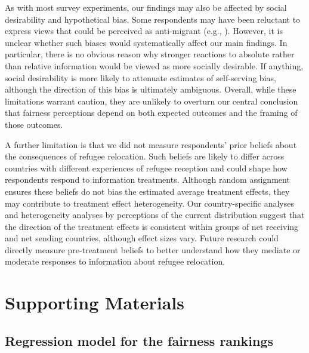 \documentclass[
  12pt,
  a4paper,
]{article}
\begin{document}
As with most survey experiments, our findings may also be affected by social desirability and hypothetical bias. Some respondents may have been reluctant to express views that could be perceived as anti-migrant (e.g., ). However, it is unclear whether such biases would systematically affect our main findings. In particular, there is no obvious reason why stronger reactions to absolute rather than relative information would be viewed as more socially desirable. If anything, social desirability is more likely to attenuate estimates of self-serving bias, although the direction of this bias is ultimately ambiguous. Overall, while these limitations warrant caution, they are unlikely to overturn our central conclusion that fairness perceptions depend on both expected outcomes and the framing of those outcomes.

A further limitation is that we did not measure respondents' prior beliefs about the consequences of refugee relocation. Such beliefs are likely to differ across countries with different experiences of refugee reception and could shape how respondents respond to information treatments. Although random assignment ensures these beliefs do not bias the estimated average treatment effects, they may contribute to treatment effect heterogeneity. Our country-specific analyses and heterogeneity analyses by perceptions of the current distribution suggest that the direction of the treatment effects is consistent within groups of net receiving and net sending countries, although effect sizes vary. Future research could directly measure pre-treatment beliefs to better understand how they mediate or moderate responses to information about refugee relocation.

\appendix


\newpage
\processdelayedfloats
\setcounter{figure}{0}
\setcounter{table}{0}
\renewcommand\thefigure{\thesection.\arabic{figure}}    
\renewcommand\thetable{\thesection.\arabic{figure}}

\section{Supporting Materials}\label{supporting-materials}

\subsection{Regression model for the fairness rankings}\label{regression-model-for-the-fairness-rankings}
\end{document}

